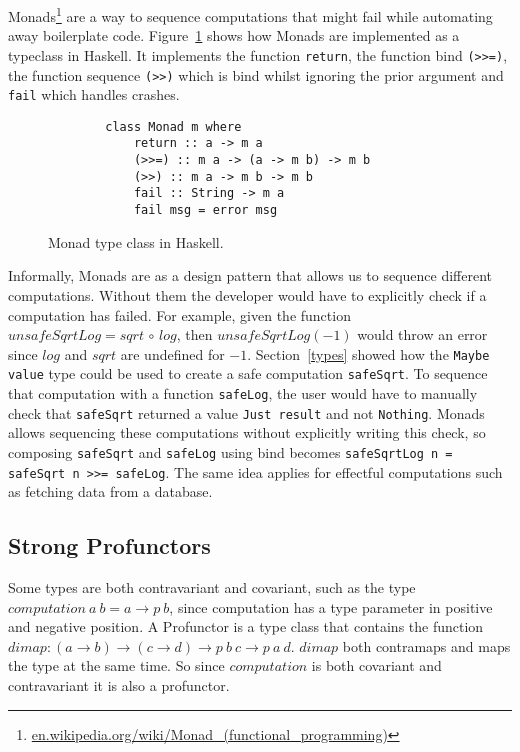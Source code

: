 Monads\footnote{\url{en.wikipedia.org/wiki/Monad_(functional_programming)}} are
a way to sequence computations that might fail while automating away boilerplate
code. Figure~\ref{monadclass} shows how Monads are implemented as a typeclass in
Haskell. It implements the function \texttt{return}, the function bind
\texttt{(>>=)}, the function sequence \texttt{(>>)} which is bind whilst
ignoring the prior argument and \texttt{fail} which handles crashes.

\begin{figure}[H]
    \begin{lstlisting}
        class Monad m where  
            return :: a -> m a  
            (>>=) :: m a -> (a -> m b) -> m b  
            (>>) :: m a -> m b -> m b  
            fail :: String -> m a  
            fail msg = error msg 
    \end{lstlisting}
    \caption{Monad type class in Haskell.}
    \label{monadclass}
\end{figure}

Informally, Monads are as a design pattern that allows us to sequence different
computations. Without them the developer would have to explicitly check if a
computation has failed. For example, given the function $unsafeSqrtLog =
sqrt\,\circ\,log$, then $unsafeSqrtLog(-1)$ would throw an error since $log$ and
$sqrt$ are undefined for $-1$.  Section~\ref{types} showed how the \texttt{Maybe
value} type could be used to create a safe computation \texttt{safeSqrt}.  To
sequence that computation with a function \texttt{safeLog}, the user would have
to manually check that \texttt{safeSqrt} returned a value \texttt{Just result}
and not \texttt{Nothing}. Monads allows sequencing these computations without
explicitly writing this check, so composing \texttt{safeSqrt} and
\texttt{safeLog} using bind becomes \texttt{safeSqrtLog n = safeSqrt n >>=
safeLog}. The same idea applies for effectful computations such as fetching data
from a database.

\subsection{Strong Profunctors}\label{profunctor}

Some types are both contravariant and covariant, such as the type $computation\
a\ b = a\rightarrow p\ b$, since computation has a type parameter in positive
and negative position. A Profunctor is a type class that contains the function
$dimap : (a\rightarrow b)\rightarrow (c\rightarrow d) \rightarrow p\ b\
c\rightarrow p\ a\ d$. $dimap$ both contramaps and maps the type at the same
time. So since $computation$ is both covariant and contravariant it is also a
profunctor. 

